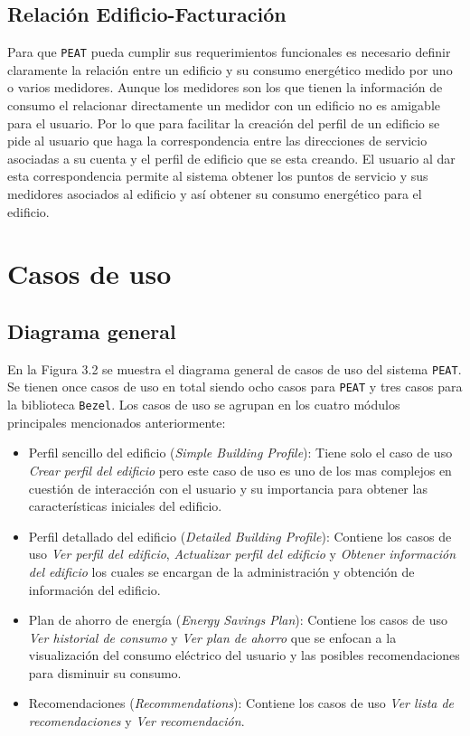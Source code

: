 
\subsection{Relación Edificio-Facturación}

Para que \texttt{PEAT} pueda cumplir sus requerimientos funcionales es necesario
definir claramente la relación entre un edificio y su consumo energético medido
por uno o varios medidores.
Aunque los medidores son los que tienen la información de consumo el relacionar
directamente un medidor con un edificio no es amigable para el usuario.
Por lo que para facilitar la creación del perfil de un edificio se pide al usuario
que haga la correspondencia entre las direcciones de servicio asociadas a su cuenta
y el perfil de edificio que se esta creando.
El usuario al dar esta correspondencia permite al sistema obtener los puntos
de servicio y sus medidores asociados al edificio y así obtener su consumo
energético para el edificio.

\section{Casos de uso}

\subsection{Diagrama general}

En la Figura 3.2 se muestra el diagrama general de casos de uso del sistema
\texttt{PEAT}. Se tienen once casos de uso en total siendo ocho casos para
\texttt{PEAT} y tres casos para la biblioteca \texttt{Bezel}.
Los casos de uso se agrupan en los cuatro módulos principales mencionados
anteriormente:

\begin{itemize}
\item Perfil sencillo del edificio (\textit{Simple Building Profile}): Tiene
  solo el caso de uso \textit{Crear perfil del edificio} pero este caso de uso
  es uno de los mas complejos en cuestión de interacción con el usuario y su
  importancia para obtener las características iniciales del edificio.
\item Perfil detallado del edificio (\textit{Detailed Building Profile}): Contiene
  los casos de uso \textit{Ver perfil del edificio},
  \textit{Actualizar perfil del edificio} y \textit{Obtener información del edificio}
  los cuales se encargan de la administración y obtención de información del
  edificio.
\item Plan de ahorro de energía (\textit{Energy Savings Plan}): Contiene los
  casos de uso \textit{Ver historial de consumo} y \textit{Ver plan de ahorro}
  que se enfocan a la visualización del consumo eléctrico del usuario y las
  posibles recomendaciones para disminuir su consumo.
\item Recomendaciones (\textit{Recommendations}): Contiene los casos de uso
  \textit{Ver lista de recomendaciones} y \textit{Ver recomendación}.
\end{itemize}

